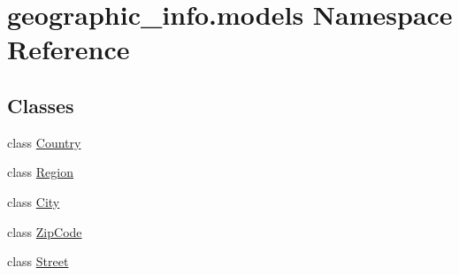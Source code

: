 \hypertarget{namespacegeographic__info_1_1models}{\section{geographic\-\_\-info.\-models Namespace Reference}
\label{namespacegeographic__info_1_1models}
}
\subsection*{Classes}
\begin{DoxyCompactItemize}
\item 
class \hyperlink{classgeographic__info_1_1models_1_1_country}{Country}
\item 
class \hyperlink{classgeographic__info_1_1models_1_1_region}{Region}
\item 
class \hyperlink{classgeographic__info_1_1models_1_1_city}{City}
\item 
class \hyperlink{classgeographic__info_1_1models_1_1_zip_code}{Zip\-Code}
\item 
class \hyperlink{classgeographic__info_1_1models_1_1_street}{Street}
\end{DoxyCompactItemize}
